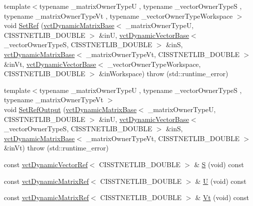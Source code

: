\begin{DoxyCompactItemize}
{\footnotesize template$<$typename \+\_\+matrix\+Owner\+Type\+U , typename \+\_\+vector\+Owner\+Type\+S , typename \+\_\+matrix\+Owner\+Type\+Vt , typename \+\_\+vector\+Owner\+Type\+Workspace $>$ }\\void \hyperlink{classnmr_s_v_d_dynamic_data_a721078abe670ddb39948e5a234374f05}{Set\+Ref} (\hyperlink{classvct_dynamic_matrix_base}{vct\+Dynamic\+Matrix\+Base}$<$ \+\_\+matrix\+Owner\+Type\+U, C\+I\+S\+S\+T\+N\+E\+T\+L\+I\+B\+\_\+\+D\+O\+U\+B\+L\+E $>$ \&in\+U, \hyperlink{classvct_dynamic_vector_base}{vct\+Dynamic\+Vector\+Base}$<$ \+\_\+vector\+Owner\+Type\+S, C\+I\+S\+S\+T\+N\+E\+T\+L\+I\+B\+\_\+\+D\+O\+U\+B\+L\+E $>$ \&in\+S, \hyperlink{classvct_dynamic_matrix_base}{vct\+Dynamic\+Matrix\+Base}$<$ \+\_\+matrix\+Owner\+Type\+Vt, C\+I\+S\+S\+T\+N\+E\+T\+L\+I\+B\+\_\+\+D\+O\+U\+B\+L\+E $>$ \&in\+Vt, \hyperlink{classvct_dynamic_vector_base}{vct\+Dynamic\+Vector\+Base}$<$ \+\_\+vector\+Owner\+Type\+Workspace, C\+I\+S\+S\+T\+N\+E\+T\+L\+I\+B\+\_\+\+D\+O\+U\+B\+L\+E $>$ \&in\+Workspace)  throw (std\+::runtime\+\_\+error)
\item 
{\footnotesize template$<$typename \+\_\+matrix\+Owner\+Type\+U , typename \+\_\+vector\+Owner\+Type\+S , typename \+\_\+matrix\+Owner\+Type\+Vt $>$ }\\void \hyperlink{classnmr_s_v_d_dynamic_data_a8099ef202b4802eacd56511fc5c393dd}{Set\+Ref\+Output} (\hyperlink{classvct_dynamic_matrix_base}{vct\+Dynamic\+Matrix\+Base}$<$ \+\_\+matrix\+Owner\+Type\+U, C\+I\+S\+S\+T\+N\+E\+T\+L\+I\+B\+\_\+\+D\+O\+U\+B\+L\+E $>$ \&in\+U, \hyperlink{classvct_dynamic_vector_base}{vct\+Dynamic\+Vector\+Base}$<$ \+\_\+vector\+Owner\+Type\+S, C\+I\+S\+S\+T\+N\+E\+T\+L\+I\+B\+\_\+\+D\+O\+U\+B\+L\+E $>$ \&in\+S, \hyperlink{classvct_dynamic_matrix_base}{vct\+Dynamic\+Matrix\+Base}$<$ \+\_\+matrix\+Owner\+Type\+Vt, C\+I\+S\+S\+T\+N\+E\+T\+L\+I\+B\+\_\+\+D\+O\+U\+B\+L\+E $>$ \&in\+Vt)  throw (std\+::runtime\+\_\+error)
\item 
const \hyperlink{classvct_dynamic_vector_ref}{vct\+Dynamic\+Vector\+Ref}$<$ C\+I\+S\+S\+T\+N\+E\+T\+L\+I\+B\+\_\+\+D\+O\+U\+B\+L\+E $>$ \& \hyperlink{classnmr_s_v_d_dynamic_data_a9ad290536daf096858e7dc9ecb4665f2}{S} (void) const 
\item 
const \hyperlink{classvct_dynamic_matrix_ref}{vct\+Dynamic\+Matrix\+Ref}$<$ C\+I\+S\+S\+T\+N\+E\+T\+L\+I\+B\+\_\+\+D\+O\+U\+B\+L\+E $>$ \& \hyperlink{classnmr_s_v_d_dynamic_data_ad77c3cbe127481ab64a8f8134ee49045}{U} (void) const 
\item 
const \hyperlink{classvct_dynamic_matrix_ref}{vct\+Dynamic\+Matrix\+Ref}$<$ C\+I\+S\+S\+T\+N\+E\+T\+L\+I\+B\+\_\+\+D\+O\+U\+B\+L\+E $>$ \& \hyperlink{classnmr_s_v_d_dynamic_data_a611c65dc458f9e976e4b1c52134adfa8}{Vt} (void) const 
\end{DoxyCompactItemize}
